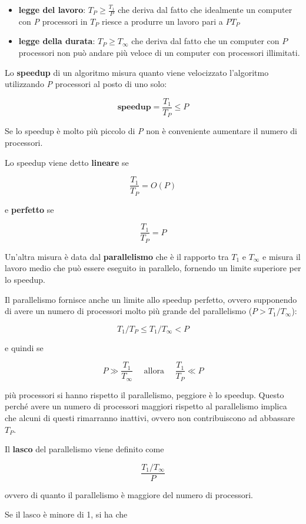 \begin{itemize}
	\item \textbf{legge del lavoro}: $T_P \geq \frac{T_1}{P}$ che deriva dal fatto che idealmente un computer con \textit{P} processori in $T_P$ riesce a produrre un lavoro pari a $P T_P$
	\item \textbf{legge della durata}: $T_P \geq T_\infty $ che deriva dal fatto che un computer con $P$ processori non può andare più veloce di un computer con processori illimitati.
\end{itemize}

Lo \textbf{speedup} di un algoritmo misura quanto viene velocizzato l'algoritmo utilizzando \emph{P} processori al posto di uno solo: 

$$\textbf{speedup} = \frac{T_1}{T_P} \leq P$$

Se lo speedup è molto più piccolo di \emph{P} non è conveniente aumentare il numero di processori.

Lo speedup viene detto \textbf{lineare} se

$$\frac{T_1}{T_P} = O(P)$$

e \textbf{perfetto} se

$$\frac{T_1}{T_P}  = P$$

Un'altra misura è data dal \textbf{parallelismo} che è il rapporto tra $T_1$ e $T_\infty$ e misura il lavoro medio che può essere eseguito in parallelo, fornendo un limite superiore per lo speedup.

Il parallelismo fornisce anche un limite allo speedup perfetto, ovvero supponendo di avere un numero di processori molto più grande del parallelismo ($P > T_1 / T_\infty$):

$$
T_1/T_P \leq T_1/T_\infty < P
$$

e quindi se 

$$P \gg \frac{T_1}{T_\infty} \quad \text{ allora } \quad \frac{T_1}{T_P} \ll P$$

più processori si hanno rispetto il parallelismo, peggiore è lo speedup. Questo perché avere un numero di processori maggiori rispetto al parallelismo implica che alcuni di questi rimarranno inattivi, ovvero non contribuiscono ad abbassare $T_P$.

Il \textbf{lasco} del parallelismo viene definito come

$$\frac{T_1/T_\infty}{P}$$

ovvero di quanto il parallelismo è maggiore del numero di processori.

Se il lasco è minore di 1, si ha che 

